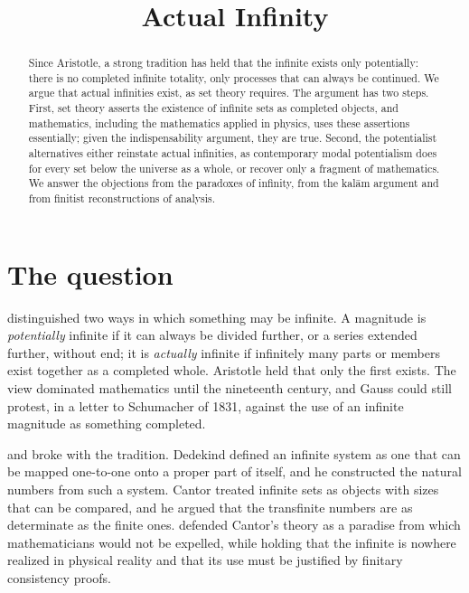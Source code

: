 \documentclass{situationist-preprint}
\title{Actual Infinity}
\begin{document}
\maketitle

\begin{abstract}
Since Aristotle, a strong tradition has held that the infinite exists only potentially: there is no completed infinite totality, only processes that can always be continued. We argue that actual infinities exist, as set theory requires. The argument has two steps. First, set theory asserts the existence of infinite sets as completed objects, and mathematics, including the mathematics applied in physics, uses these assertions essentially; given the indispensability argument, they are true. Second, the potentialist alternatives either reinstate actual infinities, as contemporary modal potentialism does for every set below the universe as a whole, or recover only a fragment of mathematics. We answer the objections from the paradoxes of infinity, from the kalām argument and from finitist reconstructions of analysis.
\end{abstract}

\section{The question}

\citet[III.6]{AristotlePhysics} distinguished two ways in which something may be infinite. A magnitude is \emph{potentially} infinite if it can always be divided further, or a series extended further, without end; it is \emph{actually} infinite if infinitely many parts or members exist together as a completed whole. Aristotle held that only the first exists. The view dominated mathematics until the nineteenth century, and Gauss could still protest, in a letter to Schumacher of 1831, against the use of an infinite magnitude as something completed.

\citet{Dedekind1888} and \citet{Cantor1883} broke with the tradition. Dedekind defined an infinite system as one that can be mapped one-to-one onto a proper part of itself, and he constructed the natural numbers from such a system. Cantor treated infinite sets as objects with sizes that can be compared, and he argued that the transfinite numbers are as determinate as the finite ones. \citet{Hilbert1926} defended Cantor's theory as a paradise from which mathematicians would not be expelled, while holding that the infinite is nowhere realized in physical reality and that its use must be justified by finitary consistency proofs.
\end{document}
